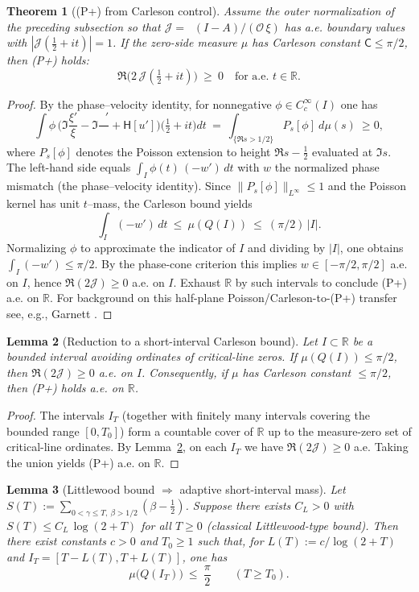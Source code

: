 \documentclass[11pt]{article}
\newtheorem{theorem}{Theorem}
\newtheorem{lemma}[theorem]{Lemma}
\theoremstyle{definition}
\theoremstyle{remark}
\newcommand{\R}{\mathbb{R}}
\DeclareMathOperator{\dettwo}{det_2}
\begin{document}
\begin{theorem}[(P+) from Carleson control]\label{thm:Pplus-from-Carleson}
Assume the outer normalization of the preceding subsection so that \(\mathcal J=\dettwo(I-A)/(\mathcal O\,\xi)\) has a.e. boundary values with \(|\mathcal J(\tfrac12+it)|=1\). If the zero-side measure \(\mu\) has Carleson constant \(\mathsf C\le \pi/2\), then \emph{(P+)} holds:
\[
 \Re\big(2\,\mathcal J(\tfrac12+it)\big)\ \ge\ 0\quad\text{for a.e. }t\in\R.
\]
\end{theorem}
\begin{proof}
By the phase--velocity identity, for nonnegative \(\phi\in C_c^\infty(I)\) one has
\[
 \int\!\phi\,\Big(\Im\frac{\xi'}{\xi}-\Im\frac{\dettwo'}{\dettwo}+\mathsf H[u']\Big)\Big(\tfrac12+it\Big)dt\ =\ \int_{\{\Re s>1/2\}} P_{s}\![\phi] \ d\mu(s)\ \ge 0,
\]
where \(P_{s}[\phi]\) denotes the Poisson extension to height \(\Re s-\tfrac12\) evaluated at \(\Im s\). The left-hand side equals \(\int_I \phi(t)\,(-w')\,dt\) with \(w\) the normalized phase mismatch (the phase--velocity identity). Since \(\|P_{s}[\phi]\|_{L^\infty}\le 1\) and the Poisson kernel has unit \(t\)–mass, the Carleson bound yields
\[
 \int_I (-w')\,dt\ \le\ \mu(Q(I))\ \le\ (\pi/2)\,|I|.
\]
Normalizing \(\phi\) to approximate the indicator of \(I\) and dividing by \(|I|\), one obtains \(\int_I (-w')\le \pi/2\). By the phase-cone criterion this implies \(w\in[-\pi/2,\pi/2]\) a.e. on \(I\), hence \(\Re(2\mathcal J)\ge 0\) a.e. on \(I\). Exhaust \(\R\) by such intervals to conclude (P+) a.e. on \(\R\). For background on this half-plane Poisson/Carleson-to-(P+) transfer see, e.g., Garnett \cite[Ch.~IV]{Garnett}.
\end{proof}
\begin{lemma}[Reduction to a short-interval Carleson bound]\label{lem:no-P}
Let \(I\subset\R\) be a bounded interval avoiding ordinates of critical-line zeros. If \(\mu(Q(I))\le \pi/2\), then \(\Re(2\mathcal J)\ge 0\) a.e. on \(I\). Consequently, if \(\mu\) has Carleson constant \(\le \pi/2\), then \emph{(P+)} holds a.e. on \(\R\).
\end{lemma}
\begin{proof}
The intervals \(I_T\) (together with finitely many intervals covering the bounded range \([0,T_0]\)) form a countable cover of \(\R\) up to the measure-zero set of critical-line ordinates. By Lemma~\ref{lem:no-P}, on each \(I_T\) we have \(\Re(2\mathcal J)\ge 0\) a.e. Taking the union yields (P+) a.e. on \(\R\).
\end{proof}
\begin{lemma}[Littlewood bound \(\Rightarrow\) adaptive short-interval mass]\label{lem:littlewood-adaptive}
Let \(S(T):=\sum_{0<\gamma\le T,\ \beta>1/2}(\beta-\tfrac12)\). Suppose there exists \(C_L>0\) with \(S(T)\le C_L\,\log(2+T)\) for all \(T\ge 0\) (classical Littlewood-type bound). Then there exist constants \(c>0\) and \(T_0\ge 1\) such that, for \(L(T):=c/\log(2+T)\) and \(I_T=[T-L(T),T+L(T)]\), one has
\[
\mu\big(Q(I_T)\big)\ \le\ \frac{\pi}{2}\qquad (T\ge T_0).
\]
\end{lemma}
\end{document}

